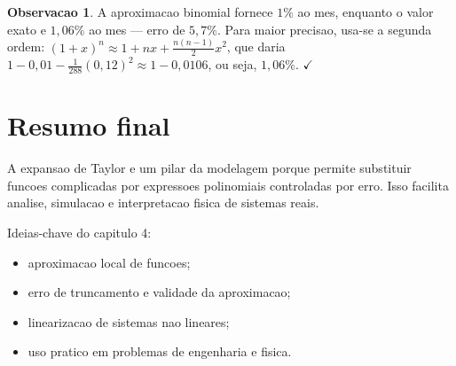 \documentclass[12pt,a4paper,oneside]{book}
\theoremstyle{definition}
\newtheorem{remark}[definition]{Observacao}
\begin{document}
\begin{remark}
A aproximacao binomial fornece $1\%$ ao mes, enquanto o valor exato e $1{,}06\%$ ao mes
--- erro de $5{,}7\%$. Para maior precisao, usa-se a segunda ordem:
$(1+x)^n \approx 1 + nx + \frac{n(n-1)}{2}x^2$, que daria
$1 - 0{,}01 - \frac{1}{288}(0{,}12)^2 \approx 1 - 0{,}0106$, ou seja, $1{,}06\%$. $\checkmark$
\end{remark}

\section{Resumo final}

A expansao de Taylor e um pilar da modelagem porque permite substituir funcoes complicadas por expressoes polinomiais controladas por erro.
Isso facilita analise, simulacao e interpretacao fisica de sistemas reais.

Ideias-chave do capitulo 4:
\begin{itemize}
    \item aproximacao local de funcoes;
    \item erro de truncamento e validade da aproximacao;
    \item linearizacao de sistemas nao lineares;
    \item uso pratico em problemas de engenharia e fisica.
\end{itemize}
\end{document}
